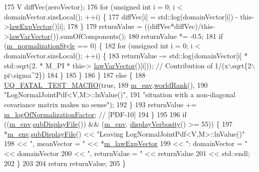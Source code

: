 \begin{DoxyCode}
175       V diffVec(zeroVector);
176       \textcolor{keywordflow}{for} (\textcolor{keywordtype}{unsigned} \textcolor{keywordtype}{int} i = 0; i < domainVector.sizeLocal(); ++i) \{
177         diffVec[i] = std::log(domainVector[i]) - this->\hyperlink{class_q_u_e_s_o_1_1_log_normal_joint_pdf_a2ca856981ab03d0c84d19715da581c83}{lawExpVector}()[i];
178       \}
179       returnValue = ((diffVec*diffVec)/this->\hyperlink{class_q_u_e_s_o_1_1_log_normal_joint_pdf_afa9f7634ae6e54973cfe14463740171e}{lawVarVector}()).sumOfComponents();
180       returnValue *= -0.5;
181       \textcolor{keywordflow}{if} (\hyperlink{class_q_u_e_s_o_1_1_base_joint_pdf_a138c99bcef7a67077d9612bddfdcb896}{m\_normalizationStyle} == 0) \{
182         \textcolor{keywordflow}{for} (\textcolor{keywordtype}{unsigned} \textcolor{keywordtype}{int} i = 0; i < domainVector.sizeLocal(); ++i) \{
183           returnValue -= std::log(domainVector[i] * std::sqrt(2. * M\_PI * this->
      \hyperlink{class_q_u_e_s_o_1_1_log_normal_joint_pdf_afa9f7634ae6e54973cfe14463740171e}{lawVarVector}()[i])); \textcolor{comment}{// Contribution of 1/(x\(\backslash\)sqrt\{2\(\backslash\)pi\(\backslash\)sigma^2\})}
184         \}
185       \}
186     \}
187     \textcolor{keywordflow}{else} \{
188       \hyperlink{_defines_8h_a56d63d18d0a6d45757de47fcc06f574d}{UQ\_FATAL\_TEST\_MACRO}(\textcolor{keyword}{true},
189                           \hyperlink{class_q_u_e_s_o_1_1_base_scalar_function_adf44141aeb765d97613286f88f235f04}{m\_env}.\hyperlink{class_q_u_e_s_o_1_1_base_environment_a78b57112bbd0e6dd0e8afec00b40ffa7}{worldRank}(),
190                           \textcolor{stringliteral}{"LogNormalJointPdf<V,M>::lnValue()"},
191                           \textcolor{stringliteral}{"situation with a non-diagonal covariance matrix makes no sense"});
192     \}
193     returnValue += \hyperlink{class_q_u_e_s_o_1_1_base_joint_pdf_ae82d4191f17af8c7a26226d127bc7850}{m\_logOfNormalizationFactor}; \textcolor{comment}{// [PDF-10]}
194   \}
195 
196   \textcolor{keywordflow}{if} ((\hyperlink{class_q_u_e_s_o_1_1_base_scalar_function_adf44141aeb765d97613286f88f235f04}{m\_env}.\hyperlink{class_q_u_e_s_o_1_1_base_environment_a8a0064746ae8dddfece4229b9ad374d6}{subDisplayFile}()) && (\hyperlink{class_q_u_e_s_o_1_1_base_scalar_function_adf44141aeb765d97613286f88f235f04}{m\_env}.
      \hyperlink{class_q_u_e_s_o_1_1_base_environment_a1fe5f244fc0316a0ab3e37463f108b96}{displayVerbosity}() >= 55)) \{
197     *\hyperlink{class_q_u_e_s_o_1_1_base_scalar_function_adf44141aeb765d97613286f88f235f04}{m\_env}.\hyperlink{class_q_u_e_s_o_1_1_base_environment_a8a0064746ae8dddfece4229b9ad374d6}{subDisplayFile}() << \textcolor{stringliteral}{"Leaving LogNormalJointPdf<V,M>::lnValue()"}
198                             << \textcolor{stringliteral}{", meanVector = "}   << *\hyperlink{class_q_u_e_s_o_1_1_log_normal_joint_pdf_a1373e1737c3198b852fab05c77abea35}{m\_lawExpVector}
199                             << \textcolor{stringliteral}{": domainVector = "} << domainVector
200                             << \textcolor{stringliteral}{", returnValue = "}  << returnValue
201                             << std::endl;
202   \}
203 
204   \textcolor{keywordflow}{return} returnValue;
205 \}
\end{DoxyCode}


